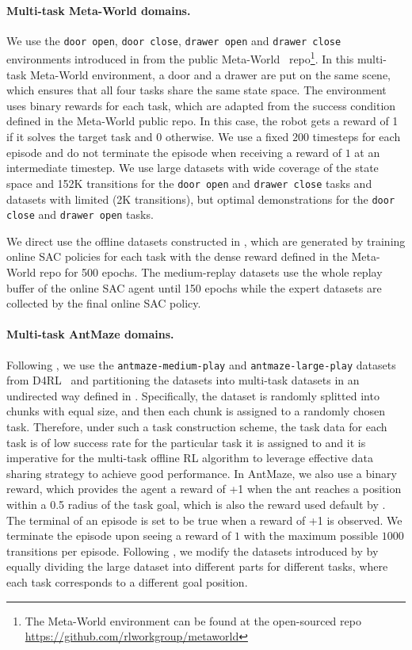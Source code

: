 \paragraph{Multi-task Meta-World domains.} We use the \texttt{door open}, \texttt{door close}, \texttt{drawer open} and \texttt{drawer close} environments introduced in \cite{yu2021conservative} from the public Meta-World~\citep{yu2020metaworld} repo\footnote{The Meta-World environment can be found at the open-sourced repo \url{https://github.com/rlworkgroup/metaworld}}. In this multi-task Meta-World environment, a door and a drawer are put on the same scene, which ensures that all four tasks share the same state space. The environment uses binary rewards for each task, which are adapted from the success condition defined in the Meta-World public repo. In this case, the robot gets a reward of 1 if it solves the target task and 0 otherwise. We use a fixed $200$ timesteps for each episode and do not terminate the episode when receiving a reward of $1$ at an intermediate timestep. We use large datasets with wide coverage of the state space and 152K transitions for the \texttt{door open} and \texttt{drawer close} tasks and datasets with limited (2K transitions), but optimal demonstrations for the \texttt{door close} and \texttt{drawer open} tasks.

We direct use the offline datasets constructed in \cite{yu2021conservative}, which are generated by training online SAC policies for each task with the dense reward defined in the Meta-World repo for 500 epochs. The medium-replay datasets use the whole replay buffer of the online SAC agent until 150 epochs while the expert datasets are collected by the final online SAC policy.

\paragraph{Multi-task AntMaze domains.} Following \cite{yu2021conservative}, we use the \texttt{antmaze-medium-play} and \texttt{antmaze-large-play} datasets from D4RL~\citep{fu2020d4rl} and partitioning the datasets into multi-task datasets in an undirected way defined in \cite{yu2021conservative}. Specifically, the dataset is randomly splitted into chunks with equal size, and then each chunk is assigned to a randomly chosen task. Therefore, under such a task construction scheme, the task data for each task is of low success rate for the particular task it is assigned to and it is imperative for the multi-task offline RL algorithm to leverage effective data sharing strategy to achieve good performance. In AntMaze, we also use a binary reward, which provides the agent a reward of +1 when the ant reaches a position within a 0.5 radius of the task goal, which is also the reward used default by \citet{fu2020d4rl}. The terminal of an episode is set to be true when a reward of +1 is observed. We terminate the episode upon seeing a reward of $1$ with the maximum possible $1000$ transitions per episode. Following \cite{yu2021conservative}, we modify the datasets introduced by \citet{fu2020d4rl} by equally dividing the large dataset into different parts for different tasks, where each task corresponds to a different goal position.

